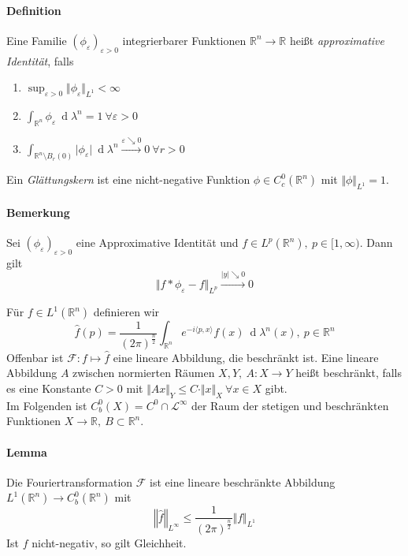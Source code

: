 \documentclass[12pt,a4paper,fleqn]{article}
\def\R{{\mathbb{R}}}
\def\d{{\operatorname{d}}}
\begin{document}
\paragraph{Definition} Eine Familie $(\phi_\varepsilon)_{\varepsilon > 0}$ integrierbarer Funktionen $\mathbb{R}^n \rightarrow \mathbb{R}$ heißt \textit{approximative Identität}, falls 
\begin{enumerate}
\item $\sup_{\varepsilon > 0} \Vert \phi_\varepsilon \Vert _{L^1}  < \infty$
\item $\int_{\mathbb{R}^n} \phi_\varepsilon\ \d\lambda^n = 1\ \forall\varepsilon>0$
\item$\int_{\mathbb{R}^n\setminus B_r(0)} \vert \phi_\varepsilon\vert\ \d\lambda^n \xrightarrow{\varepsilon\searrow 0} 0\ \forall r > 0$ 
\end{enumerate}
Ein \textit{Glättungskern} ist eine nicht-negative Funktion $\phi \in C^0_c(\mathbb{R}^n)$ mit $\Vert \phi \Vert_{L^1} = 1$.

\paragraph{Bemerkung} Sei $(\phi_\varepsilon)_{\varepsilon > 0}$ eine Approximative Identität und $f \in L^p(\mathbb{R}^n),\ p \in [1, \infty)$. Dann gilt 
\begin{displaymath}
\Vert f * \phi_\varepsilon -f\Vert_{L^p } \xrightarrow{\vert y \vert \searrow 0} 0 
\end{displaymath}

Für $f \in L^1(\R^n)$ definieren wir
\begin{displaymath}
\widehat{f}(p) = \frac{1}{(2\pi)^{\frac{n}{2}}} \int_{\mathbb{R}^n} e^{-i \langle p, x \rangle} f(x)\ \d\lambda^n(x),\ p \in \mathbb{R}^n
\end{displaymath}
Offenbar ist $\mathscr{F}\colon f \mapsto \widehat{f}$ eine lineare Abbildung, die beschränkt ist. Eine lineare Abbildung $A$ zwischen normierten Räumen $X, Y,\ A\colon X \rightarrow Y$ heißt beschränkt, falls es eine Konstante $C>0$ mit $\Vert Ax \Vert_Y \leq C \cdot \Vert x \Vert_X\ \forall x \in X$ gibt. \\
Im Folgenden ist $C^0_b(X) = C^0 \cap \mathscr{L}^\infty$ der Raum der stetigen und beschränkten Funktionen $X \rightarrow \mathbb{R},\ B\subset \mathbb{R}^n$.

\paragraph{Lemma} Die Fouriertransformation $\mathscr{F}$ ist eine lineare beschränkte Abbildung \linebreak\mbox{$L^1(\mathbb{R}^n) \rightarrow C_b^0(\mathbb{R}^n)$} mit
\begin{displaymath}
\left\Vert \widehat{f} \right\Vert_{L^\infty} \leq \frac{1}{(2\pi)^{\frac{n}{2}}} \Vert f \Vert_{L^1}
\end{displaymath}
Ist $f$ nicht-negativ, so gilt Gleichheit.
\end{document}
